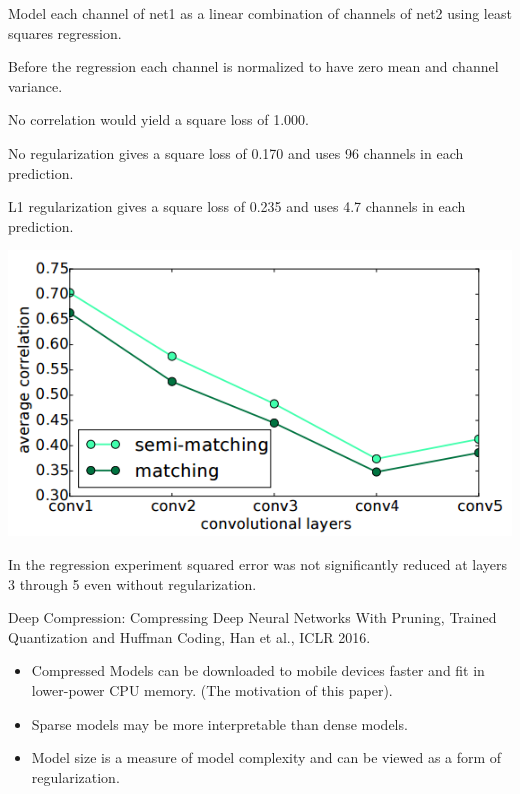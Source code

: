 {

Model each channel of net1 as a linear combination of channels of net2 using least squares regression.

\vfill
Before the regression each channel is normalized to have zero mean and channel variance.

\vfill
No correlation would yield a {\color{red} square loss of 1.000}.

\vfill
No regularization gives a {\color{red} square loss of 0.170} and uses {\color{red} 96 channels} in each prediction.

\vfill
L1 regularization gives a {\color{red} square loss of 0.235} and uses {\color{red} 4.7 channels} in each prediction.


\centerline{\includegraphics[width = 7.5in]{../images/Correlations4}}

\vfill
In the regression experiment squared error was not significantly reduced at layers 3 through 5 even without regularization. 


Deep Compression: Compressing Deep Neural
Networks With Pruning, Trained Quantization
and Huffman Coding, Han et al., ICLR 2016.

\vfill
\begin{itemize}
\item Compressed Models can be downloaded to mobile devices faster and fit in lower-power CPU memory.  (The motivation of this paper).

\vfill
\item Sparse models may be more interpretable than dense models.

\vfill
\item Model size is a measure of model complexity and can be viewed as a form of regularization.
\end{itemize}

}
